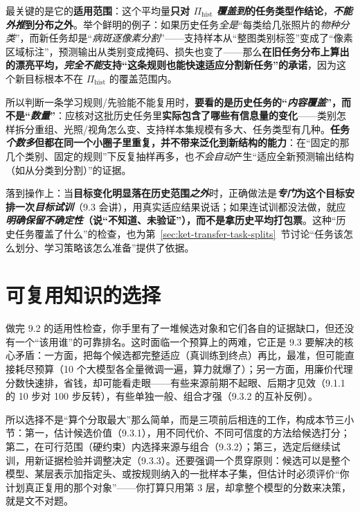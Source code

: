最关键的是它的\textbf{适用范围}：这个平均量\textbf{只对 $\Pi_{\mathrm{hist}}$ \emph{覆盖到}的任务类型作结论}，\textbf{\emph{不能外推}到分布之外}。举个鲜明的例子：如果历史任务\emph{全是}“每类给几张照片的\emph{物种分类}”，而新任务却是“\emph{病斑\emph{逐像素分割}}”——支持样本从“整图类别标签”变成了“像素区域标注”，预测输出从类别变成掩码、损失也变了——那么\textbf{在旧任务分布上算出的漂亮平均，\emph{完全不能}支持“这条规则也能快速适应分割新任务”的承诺}，因为这个新目标根本不在 $\Pi_{\mathrm{hist}}$ 的覆盖范围内。

所以判断一条学习规则/先验能不能复用时，\textbf{要看的是历史任务的“\emph{内容覆盖}”，而不是“\emph{数量}”}：应核对这批历史任务里\textbf{实际包含了哪些有信息量的变化}——类别怎样拆分重组、光照/视角怎么变、支持样本集规模有多大、任务类型有几种。\textbf{任务\emph{个数多}但都在同一个小圈子里重复，并不带来泛化到新结构的能力}：在“固定的那几个类别、固定的规则”下反复抽样再多，也\emph{不会自动}产生“适应全新预测输出结构（如从分类到分割）”的证据。

落到操作上：当\textbf{目标变化明显落在历史范围\emph{之外}}时，正确做法是\textbf{\emph{专门}为这个目标安排一次\emph{目标试训}}（9.3 会讲），用真实适应结果说话；如果连试训都没法做，就应\textbf{\emph{明确保留不确定性}（说“不知道、未验证”），而不是拿历史平均打包票}。这种“历史任务覆盖了什么”的检查，也为第~\ref{sec:ket-transfer-task-splits}~节讨论“任务该怎么划分、学习策略该怎么准备”提供了依据。

\section{可复用知识的选择}
\label{sec:ket-reuse-selection}

做完 9.2 的适用性检查，你手里有了一堆候选对象和它们各自的证据缺口，但还没有一个“该用谁”的可靠排名。这时面临一个预算上的两难，它正是 9.3 要解决的核心矛盾：一方面，把每个候选都完整适应（真训练到终点）再比，最准，但可能直接耗尽预算（10 个大模型各全量微调一遍，算力就爆了）；另一方面，用廉价代理分数快速排，省钱，却可能看走眼——有些来源前期不起眼、后期才见效（9.1.1 的 10 步对 100 步反转），有些单独一般、组合才强（9.3.2 的互补反例）。

所以选择不是“算个分取最大”那么简单，而是三项前后相连的工作，构成本节三小节：第一，估计候选价值（9.3.1），用不同代价、不同可信度的方法给候选打分；第二，在可行范围（硬约束）内选择来源与组合（9.3.2）；第三，选定后继续试训，用新证据检验并调整决定（9.3.3）。还要强调一个贯穿原则：候选可以是整个模型、某层表示加指定头、或按规则纳入的一批样本子集，但估计时必须评价“你计划真正复用的那个对象”——你打算只用第 3 层，却拿整个模型的分数来决策，就是文不对题。

